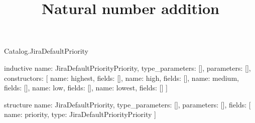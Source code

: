 \begin{lexlean}{Catalog.JiraDefaultPriority}
\title{Natural number addition}
\begin{semanticmodule}
inductive{
  name: JiraDefaultPriorityPriority,
  type_parameters: [],
  parameters: [],
  constructors: [
    {name: highest, fields: []},
    {name: high, fields: []},
    {name: medium, fields: []},
    {name: low, fields: []},
    {name: lowest, fields: []}
  ]
}

structure{
  name: JiraDefaultPriority,
  type_parameters: [],
  parameters: [],
  fields: [
    {name: priority, type: JiraDefaultPriorityPriority}
  ]
}
\end{semanticmodule}
\end{lexlean}
